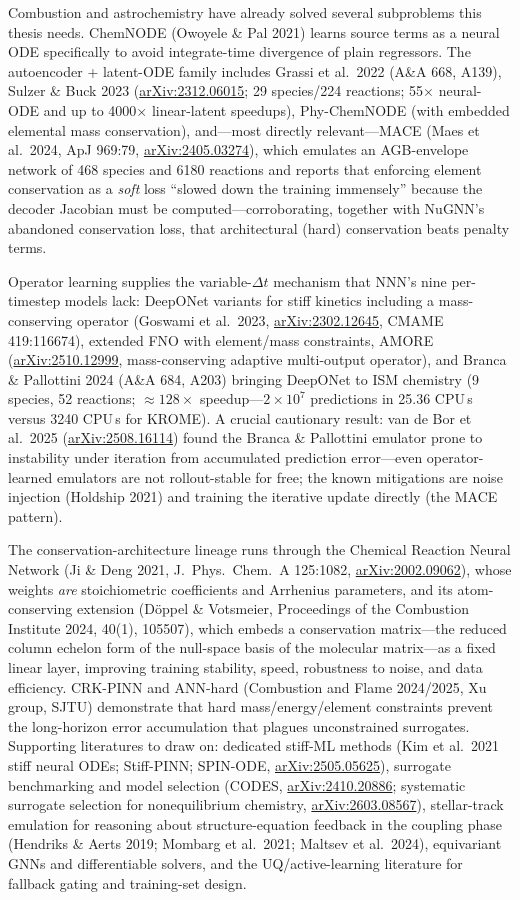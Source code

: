\documentclass[11pt,a4paper]{article}
\newcommand{\arxiv}[1]{\href{https://arxiv.org/abs/#1}{arXiv:#1}}
\begin{document}
Combustion and astrochemistry have already solved several subproblems this thesis needs. ChemNODE (Owoyele \& Pal 2021) learns source terms as a neural ODE specifically to avoid integrate-time divergence of plain regressors. The autoencoder + latent-ODE family includes Grassi et al.\ 2022 (A\&A 668, A139), Sulzer \& Buck 2023 (\arxiv{2312.06015}; 29 species/224 reactions; 55$\times$ neural-ODE and up to 4000$\times$ linear-latent speedups), Phy-ChemNODE (with embedded elemental mass conservation), and---most directly relevant---MACE (Maes et al.\ 2024, ApJ 969:79, \arxiv{2405.03274}), which emulates an AGB-envelope network of 468 species and 6180 reactions and reports that enforcing element conservation as a \emph{soft} loss ``slowed down the training immensely'' because the decoder Jacobian must be computed---corroborating, together with NuGNN's abandoned conservation loss, that architectural (hard) conservation beats penalty terms.

Operator learning supplies the variable-$\Delta t$ mechanism that NNN's nine per-timestep models lack: DeepONet variants for stiff kinetics including a mass-conserving operator (Goswami et al.\ 2023, \arxiv{2302.12645}, CMAME 419:116674), extended FNO with element/mass constraints, AMORE (\arxiv{2510.12999}, mass-conserving adaptive multi-output operator), and Branca \& Pallottini 2024 (A\&A 684, A203) bringing DeepONet to ISM chemistry (9 species, 52 reactions; ${\approx}128\times$ speedup---$2\times10^{7}$ predictions in 25.36 CPU\,s versus 3240 CPU\,s for KROME). A crucial cautionary result: van de Bor et al.\ 2025 (\arxiv{2508.16114}) found the Branca \& Pallottini emulator prone to instability under iteration from accumulated prediction error---even operator-learned emulators are not rollout-stable for free; the known mitigations are noise injection (Holdship 2021) and training the iterative update directly (the MACE pattern).

The conservation-architecture lineage runs through the Chemical Reaction Neural Network (Ji \& Deng 2021, J.\ Phys.\ Chem.\ A 125:1082, \arxiv{2002.09062}), whose weights \emph{are} stoichiometric coefficients and Arrhenius parameters, and its atom-conserving extension (D\"oppel \& Votsmeier, Proceedings of the Combustion Institute 2024, 40(1), 105507), which embeds a conservation matrix---the reduced column echelon form of the null-space basis of the molecular matrix---as a fixed linear layer, improving training stability, speed, robustness to noise, and data efficiency. CRK-PINN and ANN-hard (Combustion and Flame 2024/2025, Xu group, SJTU) demonstrate that hard mass/energy/element constraints prevent the long-horizon error accumulation that plagues unconstrained surrogates. Supporting literatures to draw on: dedicated stiff-ML methods (Kim et al.\ 2021 stiff neural ODEs; Stiff-PINN; SPIN-ODE, \arxiv{2505.05625}), surrogate benchmarking and model selection (CODES, \arxiv{2410.20886}; systematic surrogate selection for nonequilibrium chemistry, \arxiv{2603.08567}), stellar-track emulation for reasoning about structure-equation feedback in the coupling phase (Hendriks \& Aerts 2019; Mombarg et al.\ 2021; Maltsev et al.\ 2024), equivariant GNNs and differentiable solvers, and the UQ/active-learning literature for fallback gating and training-set design.
\end{document}
